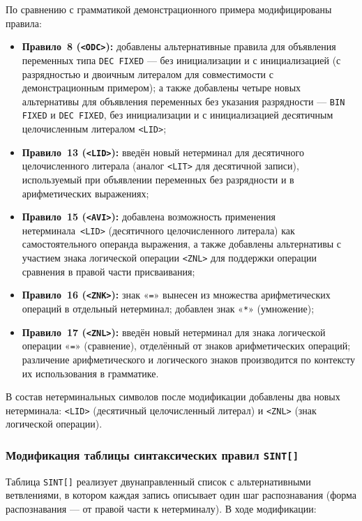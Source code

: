 \documentclass[a4paper,14pt]{extarticle}
\begin{document}
По сравнению с грамматикой демонстрационного примера модифицированы правила:
\begin{itemize}
  \item \textbf{Правило~8 (\texttt{<ODC>}):} добавлены альтернативные
        правила для объявления переменных типа \texttt{DEC FIXED} — без
        инициализации и с инициализацией (с разрядностью и двоичным литералом
        для совместимости с демонстрационным примером); а также добавлены
        четыре новых альтернативы для объявления переменных без указания
        разрядности — \texttt{BIN FIXED} и \texttt{DEC FIXED}, без инициализации
        и с инициализацией десятичным целочисленным литералом \texttt{<LID>};
  \item \textbf{Правило~13 (\texttt{<LID>}):} введён новый нетерминал
        для десятичного целочисленного литерала (аналог \texttt{<LIT>} для
        десятичной записи), используемый при объявлении переменных без
        разрядности и в арифметических выражениях;
  \item \textbf{Правило~15 (\texttt{<AVI>}):} добавлена возможность применения
        нетерминала~\texttt{<LID>} (десятичного целочисленного литерала) как
        самостоятельного операнда выражения, а также добавлены альтернативы
        с участием знака логической операции \texttt{<ZNL>} для поддержки
        операции сравнения в правой части присваивания;
  \item \textbf{Правило~16 (\texttt{<ZNK>}):} знак «\texttt{=}» вынесен
        из множества арифметических операций в отдельный нетерминал;
        добавлен знак «\texttt{*}» (умножение);
  \item \textbf{Правило~17 (\texttt{<ZNL>}):} введён новый нетерминал
        для знака логической операции «\texttt{=}» (сравнение),
        отделённый от знаков арифметических операций; различение
        арифметического и логического знаков производится по контексту
        их использования в грамматике.
\end{itemize}

В состав нетерминальных символов после модификации добавлены два новых
нетерминала: \texttt{<LID>} (десятичный целочисленный литерал) и
\texttt{<ZNL>} (знак логической операции).

\subsubsection*{Модификация таблицы синтаксических правил \texttt{SINT[]}}

Таблица \texttt{SINT[]} реализует двунаправленный список с альтернативными
ветвлениями, в котором каждая запись описывает один шаг распознавания (форма
распознавания — от правой части к нетерминалу). В ходе модификации:
\end{document}
